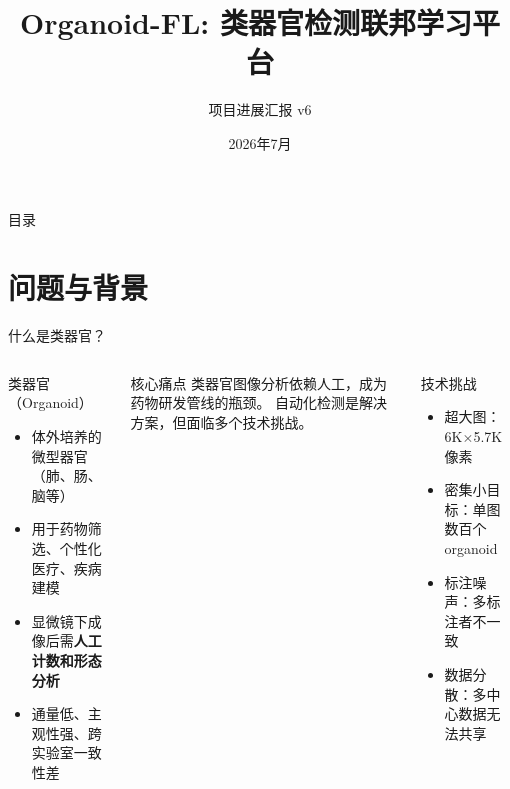 \documentclass[aspectratio=169, 10pt]{beamer}
\title[Organoid-FL]{Organoid-FL: 类器官检测联邦学习平台}
\subtitle{项目进展汇报 v6}
\date{2026年7月}
\begin{document}
\begin{frame}[plain]
  \titlepage
\end{frame}

\begin{frame}{目录}
  \tableofcontents
\end{frame}

\section{问题与背景}

\begin{frame}{什么是类器官？}
  \begin{columns}[T]
    \begin{block}{类器官（Organoid）}
      \begin{itemize}
        \item 体外培养的微型器官（肺、肠、脑等）
        \item 用于药物筛选、个性化医疗、疾病建模
        \item 显微镜下成像后需\textbf{人工计数和形态分析}
        \item 通量低、主观性强、跨实验室一致性差
      \end{itemize}
    \end{block}
    \vspace{0em}
    \begin{alertblock}{核心痛点}
      类器官图像分析依赖人工，成为药物研发管线的瓶颈。
      自动化检测是解决方案，但面临多个技术挑战。
    \end{alertblock}
    \begin{block}{技术挑战}
      \begin{itemize}
        \item \alert{超大图}：6K$\times$5.7K 像素
        \item \alert{密集小目标}：单图数百个 organoid
        \item \alert{标注噪声}：多标注者不一致
        \item \alert{数据分散}：多中心数据无法共享
      \end{itemize}
    \end{block}
  \end{columns}
\end{frame}
\end{document}
